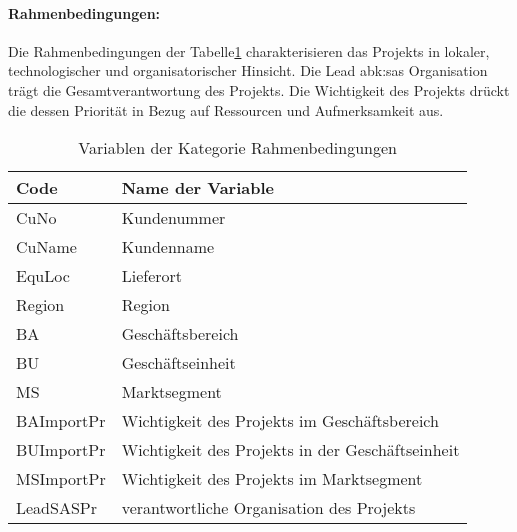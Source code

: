 \paragraph{Rahmenbedingungen:} Die Rahmenbedingungen der Tabelle\ref{tab:rahm} charakterisieren das Projekts in lokaler, technologischer und organisatorischer Hinsicht. Die Lead \gls{abk:sas} Organisation trägt die Gesamtverantwortung des Projekts. Die Wichtigkeit des Projekts drückt die dessen Priorität in Bezug auf Ressourcen und Aufmerksamkeit aus.
\begin{table}[htbp]
	\centering
	\caption{Variablen der Kategorie Rahmenbedingungen}
	\begin{tabular}{ll}
		\toprule
		\textbf{Code} & \textbf{Name der Variable} \\
		\midrule
		CuNo  & Kundenummer \\
		CuName & Kundenname \\
		EquLoc & Lieferort \\
		Region & Region \\
		BA    & Geschäftsbereich \\
		BU    & Geschäftseinheit \\
		MS    & Marktsegment \\
		BAImportPr & Wichtigkeit des Projekts im Geschäftsbereich \\
		BUImportPr & Wichtigkeit des Projekts in der Geschäftseinheit \\
		MSImportPr & Wichtigkeit des Projekts im Marktsegment \\
		LeadSASPr & verantwortliche Organisation des Projekts\\
		\bottomrule
	\end{tabular}%
	\label{tab:rahm}%
\end{table}%
